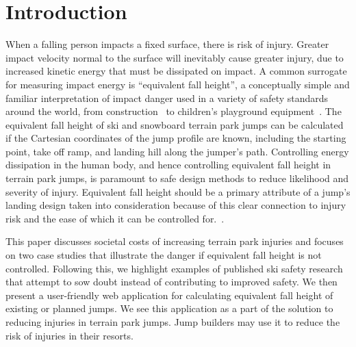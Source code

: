 \documentclass[smallextended]{svjour3}       %
\begin{document}
\section{Introduction}
\label{intro}
%
When a falling person impacts a fixed surface, there is risk of injury. Greater
impact velocity normal to the surface will inevitably cause greater injury, due
to increased kinetic energy that must be dissipated on impact. A common
surrogate for measuring impact energy is ``equivalent fall height'', a
conceptually simple and familiar interpretation of impact danger used in a
variety of safety standards around the world, from construction~\cite{OSHA2021}
to children's playground equipment~\cite{Chalmers1996}. The equivalent fall
height of ski and snowboard terrain park jumps can be
calculated~\cite{McNeil2012} if the Cartesian coordinates of the jump profile
are known, including the starting point, take off ramp, and landing hill along
the jumper's path. Controlling energy dissipation in the human body, and hence
controlling equivalent fall height in terrain park jumps, is paramount to safe
design methods to reduce likelihood and severity of injury. Equivalent fall
height should be a primary attribute of a jump's landing design taken into
consideration because of this clear connection to injury risk and the ease of
which it can be controlled for.~.

This paper discusses societal costs of increasing terrain park injuries and
focuses on two case studies that illustrate the danger if equivalent fall
height is not controlled. Following this, we highlight examples of published
ski safety research that attempt to sow doubt instead of contributing to
improved safety. We then present a user-friendly web application for
calculating equivalent fall height of existing or planned jumps. We see this
application as a part of the solution to reducing injuries in terrain park
jumps. Jump builders may use it to reduce the risk of injuries in their
resorts.
\end{document}

